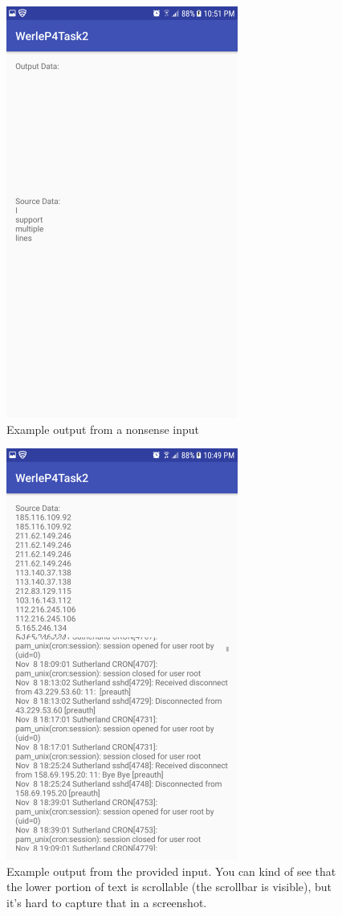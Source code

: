 \documentclass[11pt]{article}
\begin{document}
	\begin{figure}[ht]
		\includegraphics[width=3in]{img/t2s3.png}
		\centering
		\caption{Example output from a nonsense input}
	\end{figure}
	\begin{figure}[ht]
		\includegraphics[width=3in]{img/t2s4.png}
		\centering
		\caption{Example output from the provided input. You can kind of see that the lower portion of text is scrollable (the scrollbar is visible), but it's hard to capture that in a screenshot.}
	\end{figure}
	
\end{document}
